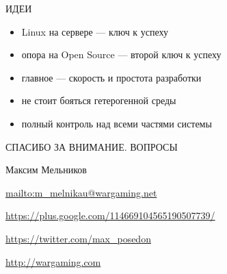 \documentclass[aspectratio=169]{beamer}
\begin{document}
\begin{frame}{ИДЕИ}
    \begin{itemize}
        \item Linux на сервере --- ключ к успеху
        \item опора на Open Source --- второй ключ к успеху
        \item главное --- скорость и простота разработки
        \item не стоит бояться гетерогенной среды
        \item полный контроль над всеми частями системы
    \end{itemize}
\end{frame}

{

\begin{frame}{СПАСИБО ЗА ВНИМАНИЕ. ВОПРОСЫ}
    \begin{block}{Максим Мельников}
    \par \url{mailto:m\_melnikau@wargaming.net}
    \par \url{https://plus.google.com/114669104565190507739/}
    \par \url{https://twitter.com/max\_posedon}
    \par \url{http://wargaming.com}
    \end{block}
\end{frame}
}
\end{document}
